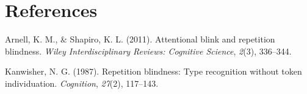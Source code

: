 \documentclass[
  man,floatsintext]{apa6}
\newlength{\cslhangindent}
\newlength{\cslentryspacingunit} %
\newenvironment{CSLReferences}[2] %
 {%
  \setlength{\parindent}{0pt}
  \ifodd #1
  \let\oldpar\par
  \def\par{\hangindent=\cslhangindent\oldpar}
  \fi
  \setlength{\parskip}{#2\cslentryspacingunit}
 }%
 {}
\begin{document}
\newpage

\hypertarget{references}{%
\section{References}\label{references}}

\begingroup
\setlength{\parindent}{-0.5in}
\setlength{\leftskip}{0.5in}

\hypertarget{refs}{}
\begin{CSLReferences}{1}{0}
\leavevmode{}%
Arnell, K. M., \& Shapiro, K. L. (2011). Attentional blink and repetition blindness. \emph{Wiley Interdisciplinary Reviews: Cognitive Science}, \emph{2}(3), 336--344.

\leavevmode{}%
Kanwisher, N. G. (1987). Repetition blindness: Type recognition without token individuation. \emph{Cognition}, \emph{27}(2), 117--143.

\end{CSLReferences}

\endgroup
\end{document}

